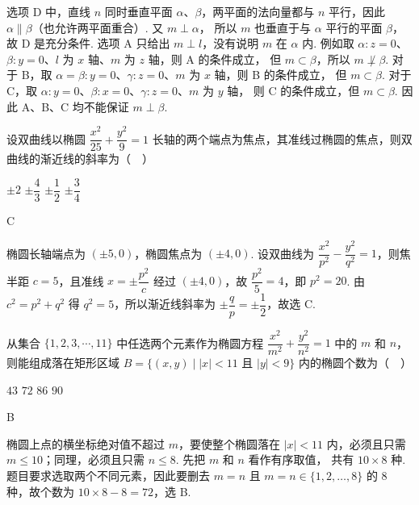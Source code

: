 \begin{solution}
选项 D 中，直线 \(n\) 同时垂直平面 \(\alpha\)、\(\beta\)，两平面的法向量都与
\(n\) 平行，因此 \(\alpha\parallel\beta\)（也允许两平面重合）. 又 \(m\perp\alpha\)，
所以 \(m\) 也垂直于与 \(\alpha\) 平行的平面 \(\beta\)，故 D 是充分条件. 选项 A
只给出 \(m\perp l\)，没有说明 \(m\) 在 \(\alpha\) 内. 例如取
\(\alpha:z=0\)、\(\beta:y=0\)、\(l\) 为 \(x\) 轴、\(m\) 为 \(z\) 轴，则 A 的条件成立，
但 \(m\subset\beta\)，所以 \(m\not\perp\beta\). 对于 B，取
\(\alpha=\beta:y=0\)、\(\gamma:z=0\)、\(m\) 为 \(x\) 轴，则 B 的条件成立，
但 \(m\subset\beta\). 对于 C，取 \(\alpha:y=0\)、\(\beta:x=0\)、\(\gamma:z=0\)、\(m\) 为 \(y\) 轴，
则 C 的条件成立，但 \(m\subset\beta\). 因此 A、B、C 均不能保证 \(m\perp\beta\).
\end{solution}

\begin{problem}
设双曲线以椭圆 \(\dfrac{x^2}{25}+\dfrac{y^2}{9}=1\) 长轴的两个端点为焦点，其准线过椭圆的焦点，则双曲线的渐近线的斜率为（\(\quad\)）

\choices
    {\(\pm2\)}
    {\(\pm\dfrac43\)}
    {\(\pm\dfrac12\)}
    {\(\pm\dfrac34\)}
\end{problem}

\begin{answer}
C
\end{answer}

\begin{solution}
椭圆长轴端点为 \((\pm5,0)\)，椭圆焦点为 \((\pm4,0)\). 设双曲线为
\(\dfrac{x^2}{p^2}-\dfrac{y^2}{q^2}=1\)，则焦半距 \(c=5\)，且准线
\(x=\pm\dfrac{p^2}{c}\) 经过 \((\pm4,0)\)，故 \(\dfrac{p^2}{5}=4\)，即
\(p^2=20\). 由 \(c^2=p^2+q^2\) 得 \(q^2=5\)，所以渐近线斜率为
\(\pm\dfrac qp=\pm\dfrac12\)，故选 C.
\end{solution}

\begin{problem}
从集合 \(\{1,2,3,\cdots,11\}\) 中任选两个元素作为椭圆方程
\(\dfrac{x^2}{m^2}+\dfrac{y^2}{n^2}=1\) 中的 \(m\) 和 \(n\)，则能组成落在矩形区域
\(B=\{(x,y)\mid |x|<11\text{ 且 }|y|<9\}\) 内的椭圆个数为（\(\quad\)）

\choices
    {\(43\)}
    {\(72\)}
    {\(86\)}
    {\(90\)}
\end{problem}

\begin{answer}
B
\end{answer}

\begin{solution}
椭圆上点的横坐标绝对值不超过 \(m\)，要使整个椭圆落在 \(|x|<11\) 内，必须且只需
\(m\leqslant10\)；同理，必须且只需 \(n\leqslant8\). 先把 \(m\) 和 \(n\) 看作有序取值，
共有 \(10\times8\) 种. 题目要求选取两个不同元素，因此要删去 \(m=n\) 且
\(m=n\in\{1,2,\ldots,8\}\) 的 \(8\) 种，故个数为
\(10\times8-8=72\)，选 B.
\end{solution}

